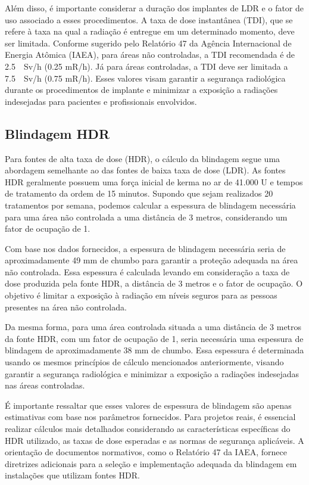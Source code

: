 \documentclass[11pt,a4paper]{article}
\begin{document}
	Além disso, é importante considerar a duração dos implantes de LDR e o fator de uso associado a esses procedimentos. A taxa de dose instantânea (TDI), que se refere à taxa na qual a radiação é entregue em um determinado momento, deve ser limitada. Conforme sugerido pelo Relatório 47 da Agência Internacional de Energia Atômica (IAEA), para áreas não controladas, a TDI recomendada é de \SI{2.5}{\mu Sv/h} (0.25 mR/h). Já para áreas controladas, a TDI deve ser limitada a \SI{7.5}{\mu Sv/h} (0.75 mR/h). Esses valores visam garantir a segurança radiológica durante os procedimentos de implante e minimizar a exposição a radiações indesejadas para pacientes e profissionais envolvidos.


\subsection*{Blindagem HDR}

	Para fontes de alta taxa de dose (HDR), o cálculo da blindagem segue uma abordagem semelhante ao das fontes de baixa taxa de dose (LDR). As fontes HDR geralmente possuem uma força inicial de kerma no ar de 41.000 U e tempos de tratamento da ordem de 15 minutos. Supondo que sejam realizados 20 tratamentos por semana, podemos calcular a espessura de blindagem necessária para uma área não controlada a uma distância de 3 metros, considerando um fator de ocupação de 1.

	Com base nos dados fornecidos, a espessura de blindagem necessária seria de aproximadamente 49 mm de chumbo para garantir a proteção adequada na área não controlada. Essa espessura é calculada levando em consideração a taxa de dose produzida pela fonte HDR, a distância de 3 metros e o fator de ocupação. O objetivo é limitar a exposição à radiação em níveis seguros para as pessoas presentes na área não controlada.

	Da mesma forma, para uma área controlada situada a uma distância de 3 metros da fonte HDR, com um fator de ocupação de 1, seria necessária uma espessura de blindagem de aproximadamente 38 mm de chumbo. Essa espessura é determinada usando os mesmos princípios de cálculo mencionados anteriormente, visando garantir a segurança radiológica e minimizar a exposição a radiações indesejadas nas áreas controladas.

	É importante ressaltar que esses valores de espessura de blindagem são apenas estimativas com base nos parâmetros fornecidos. Para projetos reais, é essencial realizar cálculos mais detalhados considerando as características específicas do HDR utilizado, as taxas de dose esperadas e as normas de segurança aplicáveis. A orientação de documentos normativos, como o Relatório 47 da IAEA, fornece diretrizes adicionais para a seleção e implementação adequada da blindagem em instalações que utilizam fontes HDR.
\end{document}
